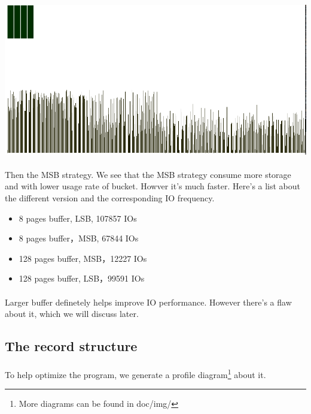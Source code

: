 \documentclass{article}
\begin{document}
        \paragraph{} \includegraphics[scale=0.4]{img/pic20000_h.png}
        \paragraph{}
            Then the MSB strategy. We see that the MSB strategy consume more storage and with lower usage rate of bucket. Howver it's much faster. Here's a list about the different version and the corresponding IO frequency.
        \begin{itemize}
            \item 8 pages buffer, LSB, 107857 IOs
            \item 8 pages buffer，MSB, 67844 IOs
            \item 128 pages buffer, MSB，12227 IOs
            \item 128 pages buffer, LSB，99591 IOs
        \end{itemize}
        \paragraph{}
            Larger buffer definetely helps improve IO performance. However there's a flaw about it, which we will discuss later.
    \subsection{The record structure}
        \paragraph{}
            To help optimize the program, we generate a profile diagram\footnote{More diagrams can be found in doc/img/} about it.
\end{document}
